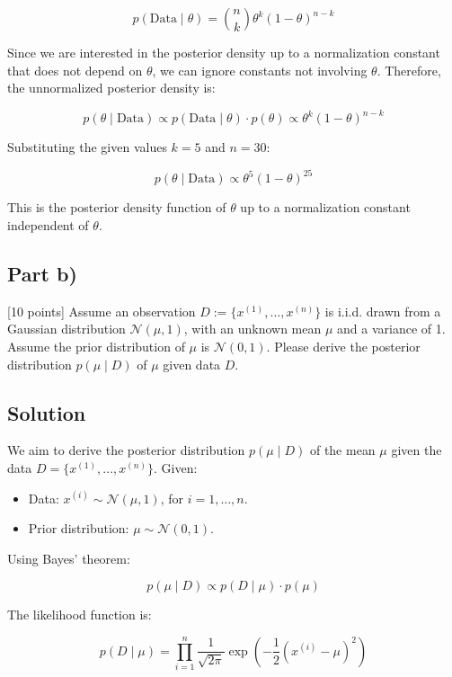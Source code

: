 \documentclass{article}
\begin{document}
\[
p(\text{Data} \mid \theta) = \binom{n}{k} \theta^{k} (1 - \theta)^{n - k}
\]

Since we are interested in the posterior density up to a normalization constant that does not depend on $\theta$, we can ignore constants not involving $\theta$. Therefore, the unnormalized posterior density is:

\[
p(\theta \mid \text{Data}) \propto p(\text{Data} \mid \theta) \cdot p(\theta) \propto \theta^{k} (1 - \theta)^{n - k}
\]

Substituting the given values $k = 5$ and $n = 30$:

\[
p(\theta \mid \text{Data}) \propto \theta^{5} (1 - \theta)^{25}
\]

This is the posterior density function of $\theta$ up to a normalization constant independent of $\theta$.

\subsection*{Part b)}

[10 points] Assume an observation $D := \{x^{(1)}, \ldots, x^{(n)}\}$ is i.i.d. drawn from a Gaussian distribution $\mathcal{N}(\mu, 1)$, with an unknown mean $\mu$ and a variance of 1. Assume the prior distribution of $\mu$ is $\mathcal{N}(0, 1)$. Please derive the posterior distribution $p(\mu \mid D)$ of $\mu$ given data $D$.

\subsection*{Solution}

We aim to derive the posterior distribution $p(\mu \mid D)$ of the mean $\mu$ given the data $D = \{ x^{(1)}, \ldots, x^{(n)} \}$. Given:

\begin{itemize}
    \item Data: $x^{(i)} \sim \mathcal{N}(\mu, 1)$, for $i = 1, \ldots, n$.
    \item Prior distribution: $\mu \sim \mathcal{N}(0, 1)$.
\end{itemize}

Using Bayes' theorem:

\[
p(\mu \mid D) \propto p(D \mid \mu) \cdot p(\mu)
\]

The likelihood function is:

\[
p(D \mid \mu) = \prod_{i=1}^n \frac{1}{\sqrt{2\pi}} \exp\left(-\frac{1}{2}(x^{(i)} - \mu)^2\right)
\]
\end{document}

